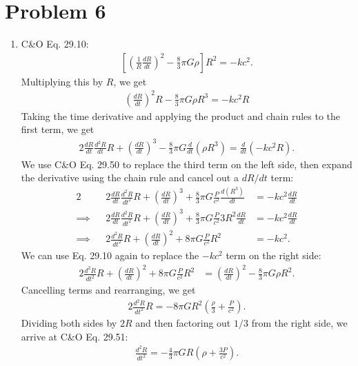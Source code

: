 \documentclass[11pt,letterpaper]{article}
\begin{document}
\newpage

\section*{Problem 6}
\begin{enumerate}[label=(\roman*)]
    \item C\&O Eq. 29.10:
        \begin{align*}
            \left[\left(\frac{1}{R}\frac{dR}{dt}\right)^2 - \frac{8}{3}\pi G\rho\right]R^2 = -kc^2.
        \end{align*}
        Multiplying this by $R$, we get 
        \begin{align*}
            \left(\frac{dR}{dt}\right)^2 R - \frac{8}{3}\pi G\rho R^3 = -kc^2R 
        \end{align*}
        Taking the time derivative and applying the product and chain rules to the first term, we get 
        \begin{align*}
            2\frac{dR}{dt}\frac{d^2R}{dt}R + \left(\frac{dR}{dt}\right)^3 - \frac{8}{3}\pi G \frac{d}{dt}(\rho R^3) = \frac{d}{dt}(-kc^2R).
        \end{align*}
        We use C\&O Eq. 29.50 to replace the third term on the left side, then expand the derivative using the chain rule and cancel out a $dR/dt$ term:
        \begin{alignat*}{2}
            &&2\frac{dR}{dt}\frac{d^2R}{dt^2}R + \left(\frac{dR}{dt}\right)^3 + \frac{8}{3}\pi G\frac{P}{c^2}\frac{d(R^3)}{dt} &= -kc^2\frac{dR}{dt} \\
            \implies&&2\frac{dR}{dt}\frac{d^2R}{dt^2}R + \left(\frac{dR}{dt}\right)^3 + \frac{8}{3}\pi G\frac{P}{c^2}3R^2\frac{dR}{dt} &= -kc^2\frac{dR}{dt} \\
            \implies&&2\frac{d^2R}{dt^2}R + \left(\frac{dR}{dt}\right)^2 + 8\pi G\frac{P}{c^2}R^2 &= -kc^2.
        \end{alignat*}
        We can use Eq. 29.10 again to replace the $-kc^2$ term on the right side: 
        \begin{align*}
            2\frac{d^2R}{dt^2}R + \left(\frac{dR}{dt}\right)^2 + 8\pi G\frac{P}{c^2}R^2 &= \left(\frac{dR}{dt}\right)^2 - \frac{8}{3}\pi G\rho R^2.
        \end{align*}
        Cancelling terms and rearranging, we get 
        \begin{align*}
            2\frac{d^2R}{dt^2}R = -8\pi GR^2(\frac{\rho}{3} + \frac{P}{c^2}).
        \end{align*}
        Dividing both sides by $2R$ and then factoring out $1/3$ from the right side, we arrive at C\&O Eq. 29.51:
        \begin{align*}
            \frac{d^2R}{dt^2} = -\frac{4}{3}\pi GR(\rho + \frac{3P}{c^2}).
        \end{align*}


\end{enumerate}
\end{document}
